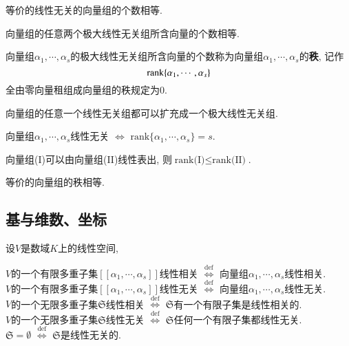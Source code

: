 \begin{Corollary}
等价的线性无关的向量组的个数相等.
\end{Corollary}

\begin{Corollary}
向量组的任意两个极大线性无关组所含向量的个数相等.
\end{Corollary}

\begin{Definition}[!!!!!, 向量组的秩]
向量组$\alpha_1, \cdots, \alpha_s$的极大线性无关组所含向量的个数称为向量组$\alpha_1, \cdots, \alpha_s$的\textbf{秩}, 记作
$$ \operatorname{rank} \{ \alpha_1, \cdots, \alpha_s \}  $$
全由零向量租组成向量组的秩规定为$0$.
\end{Definition}

\begin{Proposition}
向量组的任意一个线性无关组都可以扩充成一个极大线性无关组.
\end{Proposition}

\begin{Proposition}[!!!]
向量组$\alpha_1, \cdots, \alpha_s$线性无关 $\Leftrightarrow $ $\text{rank} \{ \alpha_1, \cdots, \alpha_s\} = s$. 
\end{Proposition}

\begin{Proposition}[!!]
向量组(I)可以由向量组(II)线性表出, 则$\text{rank(I)} \le \text{rank(II)}$.
\end{Proposition}

\begin{Corollary}[!!]
等价的向量组的秩相等.
\end{Corollary}

\subsection{基与维数、坐标}

\begin{Definition}[!]
设$V$是数域$K$上的线性空间, 
\begin{tightcenter}
$V$的一个有限多重子集$[[ \alpha_1, \cdots, \alpha_s ]]$线性相关 $\stackrel{\text{def}}{\iff}$ 向量组$\alpha_1, \cdots, \alpha_s$线性相关. \\
$V$的一个有限多重子集$[[ \alpha_1, \cdots, \alpha_s ]]$线性无关 $\stackrel{\text{def}}{\iff}$ 向量组$\alpha_1, \cdots, \alpha_s$线性无关. \\
$V$的一个无限多重子集$\mathfrak{S}$线性相关 $\stackrel{\text{def}}{\iff}$ $\mathfrak{S}$有一个有限子集是线性相关的. \\
$V$的一个无限多重子集$\mathfrak{S}$线性无关 $\stackrel{\text{def}}{\iff}$ $\mathfrak{S}$任何一个有限子集都线性无关. \\
$\mathfrak{S} = \emptyset$ $\stackrel{\text{def}}{\iff}$ $\mathfrak{S}$是线性无关的.
\end{tightcenter}
\end{Definition}

